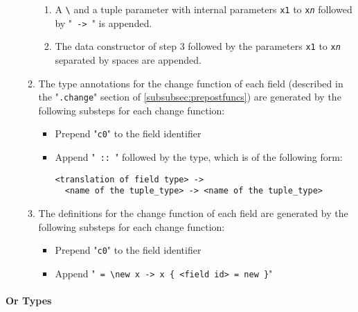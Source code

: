 \documentclass[diploma]{softlab-thesis}
\begin{document}
\begin{itemize}
\begin{enumerate}
\begin{enumerate}
\item
A \verb|\| and a tuple parameter with internal parameters \texttt{x1} to
\texttt{x\textit{n}} followed by "\texttt{ -> }" is appended.

\item
The data constructor of step 3 followed by the parameters \texttt{x1} to
\texttt{x\textit{n}} separated by spaces are appended.

\end{enumerate}

\item
The type annotations for the change function of each field (described in the
"\texttt{.change}" section of \ref{subsubsec:prepostfuncs}) are generated by
the following substeps for each change function:

\begin{itemize}
\item
Prepend "\texttt{c0}" to the field identifier

\item
Append "\verb| :: |" followed by the type, which is of the following form:

\begin{verbatim}
<translation of field type> ->
  <name of the tuple_type> -> <name of the tuple_type>
\end{verbatim}


\end{itemize}

\item
The definitions for the change function of each field are generated by the
following substeps for each change function:

\begin{itemize}
\item
Prepend "\texttt{c0}" to the field identifier

\item
Append "\verb| = \new x -> x { <field id> = new }|"

\end{itemize}

\end{enumerate}

\end{itemize}

\paragraph{Or Types}
\end{document}
